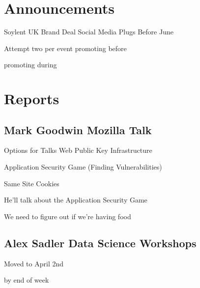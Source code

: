 \documentclass[11pt,hacksoc]{meetingmins}
\begin{document}
\maketitle

\section{Announcements}
\begin{items}

	\item
	Soylent UK Brand Deal
		 Social Media Plugs Before June
		
		\subitem
		Attempt two per event
			 promoting before
			
			 promoting during

\end{items}

\section{Reports}

\subsection{Mark Goodwin Mozilla Talk}
\begin{hiddensubitems}
	\item
	Options for Talks
		\subitem
		Web Public Key Infrastructure 
		
		\subitem
		Application Security Game (Finding Vulnerabilities)
		
		\subitem
		Same Site Cookies
		
	\item
	He'll talk about the Application Security Game
	
	\item
	We need to figure out if we're having food
		
\end{hiddensubitems}

\subsection{Alex Sadler Data Science Workshops}
\begin{hiddensubitems}
	\item
	Moved to April 2nd
	
	\item
	 by end of week
	
\end{hiddensubitems}
\end{document}
